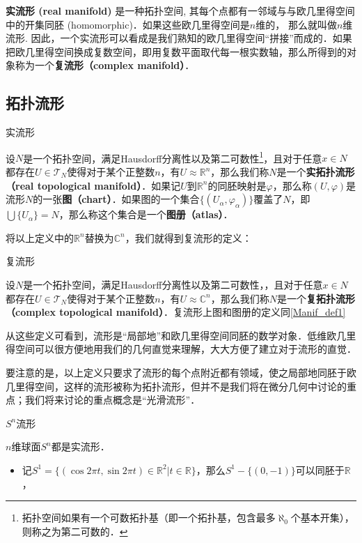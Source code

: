 

\textbf{实流形 (real manifold)} 是一种拓扑空间, 其每个点都有一邻域与与欧几里得空间中的开集同胚 (homomorphic)．如果这些欧几里得空间是$n$维的， 那么就叫做$n$维流形. 因此，一个实流形可以看成是我们熟知的欧几里得空间“拼接”而成的．如果把欧几里得空间换成复数空间，即用复数平面取代每一根实数轴，那么所得到的对象称为一个\textbf{复流形（complex manifold）}．

\subsection{拓扑流形}

\begin{definition}{实流形}\label{Manif_def1}

设$N$是一个拓扑空间，满足Hausdorff分离性以及第二可数性\footnote{拓扑空间如果有一个可数拓扑基（即一个拓扑基，包含最多$\aleph_0$个基本开集），则称之为第二可数的．}，且对于任意$x\in N$都存在$U\in\mathcal{T}_N$使得对于某个正整数$n$，有$U\approx\mathbb{R}^n$，那么我们称$N$是一个\textbf{实拓扑流形（real topological manifold）}．如果记$U$到$\mathbb{R}^n$的同胚映射是$\varphi$，那么称$(U, \varphi)$是流形$N$的一张\textbf{图（chart）}．如果图的一个集合$\{(U_\alpha, \varphi_\alpha)\}$覆盖了$N$，即$\bigcup\{U_\alpha\}=N$，那么称这个集合是一个\textbf{图册（atlas）}．

\end{definition}

将以上定义中的$\mathbb{R}^n$替换为$\mathbb{C}^n$，我们就得到复流形的定义：

\begin{definition}{复流形}

设$N$是一个拓扑空间，满足Hausdorff分离性以及第二可数性，，且对于任意$x\in N$都存在$U\in\mathcal{T}_N$使得对于某个正整数$n$，有$U\approx\mathbb{C}^n$，那么我们称$N$是一个\textbf{复拓扑流形（complex topological manifold）}．复流形上图和图册的定义同\autoref{Manif_def1} 

\end{definition}

从这些定义可看到，流形是“局部地”和欧几里得空间同胚的数学对象．低维欧几里得空间可以很方便地用我们的几何直觉来理解，大大方便了建立对于流形的直觉．

要注意的是，以上定义只要求了流形的每个点附近都有领域，使之局部地同胚于欧几里得空间，这样的流形被称为拓扑流形，但并不是我们将在微分几何中讨论的重点；我们将来讨论的重点概念是“光滑流形”．

\begin{example}{$S^n$流形}

$n$维球面$S^n$都是实流形．
\begin{itemize}
\item 记$S^1=\{(\cos{2\pi t},\sin{2\pi t})\in\mathbb{R}^2|t\in\mathbb{R}\}$，那么$S^1-\{(0,-1)\}$可以同胚于$\mathbb{R}$，


\end{itemize}

\end{example}


